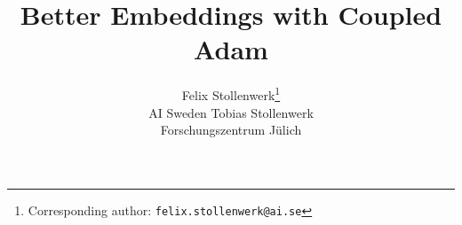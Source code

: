 \title{Better Embeddings with Coupled Adam}

\author{
Felix Stollenwerk\thanks{Corresponding author: \texttt{felix.stollenwerk@ai.se}} \\ AI Sweden
\And  
Tobias Stollenwerk \\ Forschungszentrum Jülich
}
